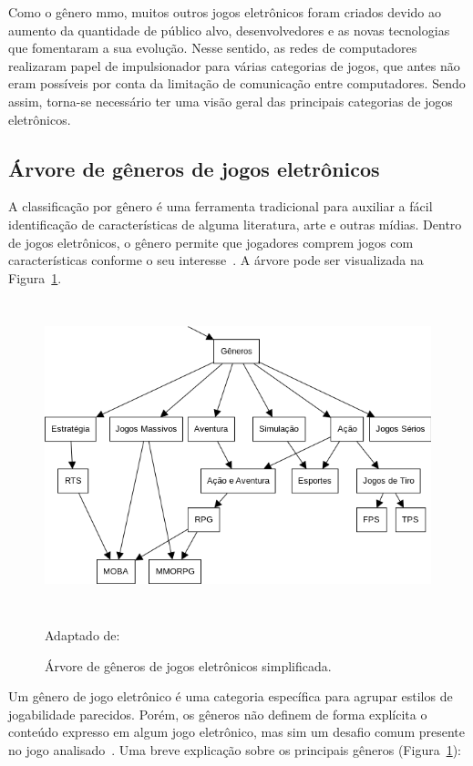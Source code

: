Como o gênero \ac{mmo}, muitos outros jogos eletrônicos foram criados devido ao aumento da quantidade de público alvo, desenvolvedores e as novas tecnologias que fomentaram a sua evolução.
%
Nesse sentido, as redes de computadores realizaram papel de impulsionador para várias categorias de jogos, que antes não eram possíveis por conta da limitação de comunicação entre computadores.
%
Sendo assim, torna-se necessário ter uma visão geral das principais categorias de jogos eletrônicos.



\subsection{Árvore de gêneros de jogos eletrônicos}
\label{sec:arvore_generos}


A classificação por gênero é uma ferramenta tradicional para auxiliar a fácil identificação de características de alguma literatura, arte e outras mídias.
%
Dentro de jogos eletrônicos, o gênero permite que jogadores comprem jogos com características conforme o seu interesse~\cite{Clarke2015}.
%
A árvore pode ser visualizada na Figura~\ref{fig:generos}.


\begin{figure}[htb!]
\caption{Árvore de gêneros de jogos eletrônicos simplificada.}
\label{fig:generos}
\includegraphics[height=9cm]{img/cap2/generos.png}
\centering

Adaptado de:~\cite{adams_1208533}
\end{figure}



Um gênero de jogo eletrônico é uma categoria específica para agrupar estilos de jogabilidade parecidos.
%
Porém, os gêneros não definem de forma explícita o conteúdo expresso em algum jogo eletrônico, mas sim um desafio comum presente no jogo analisado~\cite{adams_1208533, video_game_technologies}.
%
Uma breve explicação sobre os principais gêneros (Figura~\ref{fig:generos}):



